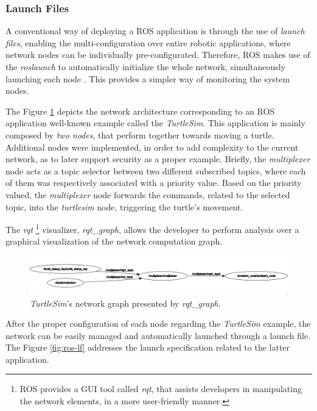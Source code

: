 \subsubsection{Launch Files}

A conventional way of deploying a ROS application is through the use of \textit{launch files}, enabling the multi-configuration over entire robotic applications, where network nodes can be individually pre-configurated. Therefore, ROS makes use of the \textit{roslaunch} to automatically initialize the whole network, simultaneously launching each node \cite{intro-ros}. This provides a simpler way of monitoring the system nodes. 

The Figure \ref{fig:ts-rqt-graph} depicts the network architecture corresponding to an ROS application well-known example called the \textit{TurtleSim}. This application is mainly composed by \textit{two nodes}, that perform together towards moving a turtle. Additional nodes were implemented, in order to add complexity to the current network, as to later support security as a proper example. Briefly, the \textit{multiplexer} node acts as a topic selector between two different subscribed topics, where each of them was respectively associated with a priority value. Based on the priority valued, the \textit{multiplexer} node forwards the commands, related to the selected topic, into the \textit{turtlesim} node, triggering the turtle's movement. 

The \textit{rqt} \footnote[1]{ROS provides a GUI tool called \textit{rqt}, that assists developers in manipulating the network elements, in a more user-friendly manner.} visualizer, \textit{rqt\_graph}, allows the developer to perform analysis over a graphical visualization of the network computation graph.

\begin{figure}[H]
    \centering
    \includegraphics[width=0.8\linewidth]{img/ts_rqt_graph.png}
    \caption{\textit{TurtleSim}'s network graph presented by \textit{rqt\_graph}.}
    \label{fig:ts-rqt-graph}
\end{figure}

After the proper configuration of each node regarding the \textit{TurtleSim} example, the network can be easily managed and automatically launched through a launch file. The Figure \ref{fig:ros-lf} addresses the launch specification related to the latter application.

